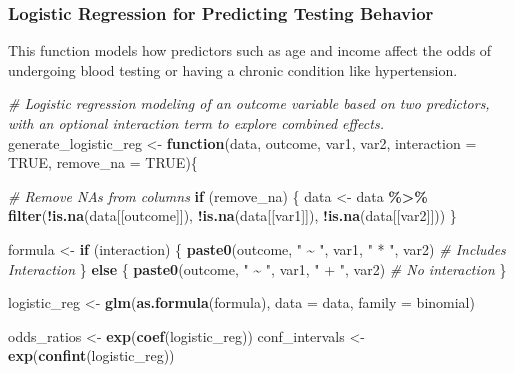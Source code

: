\documentclass[
]{article}
\newenvironment{Shaded}{\begin{snugshade}}{\end{snugshade}}
\newcommand{\AttributeTok}[1]{\textcolor[rgb]{0.13,0.29,0.53}{#1}}
\newcommand{\CommentTok}[1]{\textcolor[rgb]{0.56,0.35,0.01}{\textit{#1}}}
\newcommand{\ConstantTok}[1]{\textcolor[rgb]{0.56,0.35,0.01}{#1}}
\newcommand{\ControlFlowTok}[1]{\textcolor[rgb]{0.13,0.29,0.53}{\textbf{#1}}}
\newcommand{\FunctionTok}[1]{\textcolor[rgb]{0.13,0.29,0.53}{\textbf{#1}}}
\newcommand{\NormalTok}[1]{#1}
\newcommand{\OtherTok}[1]{\textcolor[rgb]{0.56,0.35,0.01}{#1}}
\newcommand{\SpecialCharTok}[1]{\textcolor[rgb]{0.81,0.36,0.00}{\textbf{#1}}}
\newcommand{\StringTok}[1]{\textcolor[rgb]{0.31,0.60,0.02}{#1}}
\begin{document}
\subsubsection{Logistic Regression for Predicting Testing
Behavior}\label{logistic-regression-for-predicting-testing-behavior}

This function models how predictors such as age and income affect the
odds of undergoing blood testing or having a chronic condition like
hypertension.

\begin{Shaded}
\begin{Highlighting}[]
\CommentTok{\# Logistic regression modeling of an outcome variable based on two predictors, with an optional interaction term to explore combined effects.}
\NormalTok{generate\_logistic\_reg }\OtherTok{\textless{}{-}} \ControlFlowTok{function}\NormalTok{(data, outcome, var1, var2, }\AttributeTok{interaction =} \ConstantTok{TRUE}\NormalTok{, }\AttributeTok{remove\_na =} \ConstantTok{TRUE}\NormalTok{)\{}
  
  \CommentTok{\# Remove NAs from columns}
  \ControlFlowTok{if}\NormalTok{ (remove\_na) \{}
\NormalTok{    data }\OtherTok{\textless{}{-}}\NormalTok{ data }\SpecialCharTok{\%\textgreater{}\%} 
      \FunctionTok{filter}\NormalTok{(}\SpecialCharTok{!}\FunctionTok{is.na}\NormalTok{(data[[outcome]]), }\SpecialCharTok{!}\FunctionTok{is.na}\NormalTok{(data[[var1]]), }\SpecialCharTok{!}\FunctionTok{is.na}\NormalTok{(data[[var2]]))}
\NormalTok{  \}}
  
\NormalTok{  formula }\OtherTok{\textless{}{-}} \ControlFlowTok{if}\NormalTok{ (interaction) \{}
    \FunctionTok{paste0}\NormalTok{(outcome, }\StringTok{" \textasciitilde{} "}\NormalTok{, var1, }\StringTok{" * "}\NormalTok{, var2) }\CommentTok{\# Includes Interaction}
\NormalTok{  \} }\ControlFlowTok{else}\NormalTok{ \{}
    \FunctionTok{paste0}\NormalTok{(outcome, }\StringTok{" \textasciitilde{} "}\NormalTok{, var1, }\StringTok{" + "}\NormalTok{, var2) }\CommentTok{\# No interaction}
\NormalTok{  \}}
  
\NormalTok{  logistic\_reg }\OtherTok{\textless{}{-}} \FunctionTok{glm}\NormalTok{(}\FunctionTok{as.formula}\NormalTok{(formula), }\AttributeTok{data =}\NormalTok{ data, }\AttributeTok{family =}\NormalTok{ binomial)}
  
\NormalTok{  odds\_ratios }\OtherTok{\textless{}{-}} \FunctionTok{exp}\NormalTok{(}\FunctionTok{coef}\NormalTok{(logistic\_reg))}
\NormalTok{  conf\_intervals }\OtherTok{\textless{}{-}} \FunctionTok{exp}\NormalTok{(}\FunctionTok{confint}\NormalTok{(logistic\_reg))}
  

\end{Highlighting}
\end{Shaded}
\end{document}
